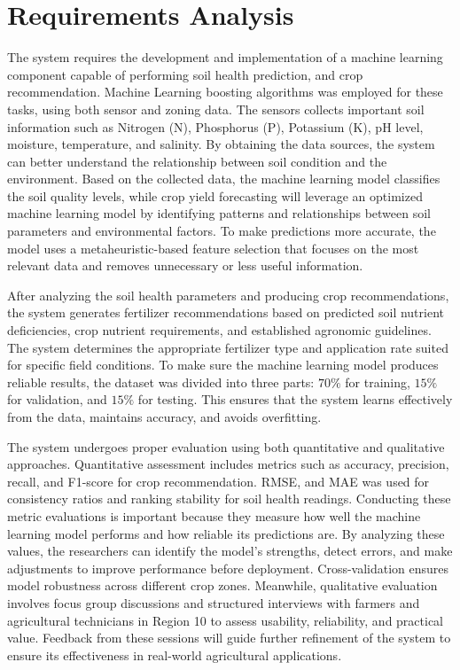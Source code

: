 {	\section{Requirements Analysis}
	The system requires the development and implementation of a machine learning component capable of performing soil health prediction, and  crop recommendation. Machine Learning boosting algorithms was employed for these tasks, using both sensor and zoning data. The sensors collects important soil information such as Nitrogen (N), Phosphorus (P), Potassium (K), pH level, moisture, temperature, and salinity. By obtaining the data sources, the system can better understand the relationship between soil condition and the environment. Based on the collected data, the machine learning model classifies the soil quality levels, while crop yield forecasting will leverage an optimized machine learning model by identifying patterns and relationships between soil parameters and environmental factors. To make predictions more accurate, the model uses a metaheuristic-based feature selection that focuses on the most relevant data and removes unnecessary or less useful information. 
	
	After analyzing the soil health parameters and producing crop recommendations, the system generates fertilizer recommendations based on predicted soil nutrient deficiencies, crop nutrient requirements, and established agronomic guidelines. The system determines the appropriate fertilizer type and application rate suited for specific field conditions. To make sure the machine learning model produces reliable results, the dataset was divided into three parts: $70\%$ for training, $15\%$ for validation, and $15\%$ for testing. This ensures that the system learns effectively from the data, maintains accuracy, and avoids overfitting.
	
	The system undergoes proper evaluation using both quantitative and qualitative approaches. Quantitative assessment includes metrics such as accuracy, precision, recall, and F1-score for crop recommendation. RMSE, and MAE was used for consistency ratios and ranking stability for soil health readings. Conducting these metric evaluations is important because they measure how well the machine learning model performs and how reliable its predictions are. By analyzing these values, the researchers can identify the model’s strengths, detect errors, and make adjustments to improve performance before deployment. Cross-validation ensures model robustness across different crop zones. Meanwhile, qualitative evaluation involves focus group discussions and structured interviews with farmers and agricultural technicians in Region 10 to assess usability, reliability, and practical value. Feedback from these sessions will guide further refinement of the system to ensure its effectiveness in real-world agricultural applications.
	
}
